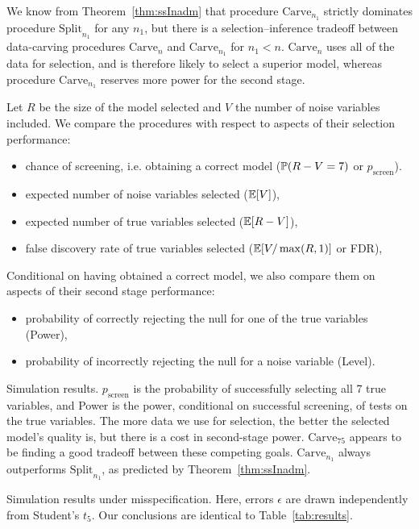 \documentclass{article}
\theoremstyle{definition}
\begin{document}
We know from Theorem~\ref{thm:ssInadm} that procedure $\text{Carve}_{n_1}$ strictly dominates procedure $\text{Split}_{n_1}$ for any $n_1$, but there is a selection--inference tradeoff between data-carving procedures $\text{Carve}_n$ and $\text{Carve}_{n_1}$ for $n_1<n$. $\text{Carve}_{n}$ uses all of the data for selection, and is therefore likely to select a superior model, whereas procedure $\text{Carve}_{n_1}$ reserves more power for the second stage.

Let $R$ be the size of the model selected and $V$ the number of noise variables included. We compare the procedures with respect to aspects of their selection performance:
\begin{itemize}
  \item chance of screening, i.e. obtaining a correct model ($\P(R-V=7)$ or $p_{\text{screen}}$).
  \item expected number of noise variables selected ($\E[V]$),
  \item expected number of true variables selected ($\E[R-V]$),
  \item false discovery rate of true variables selected
    ($\E[V/\max(R, 1)]$ or FDR),
\end{itemize}

Conditional on having obtained a correct model, we also compare them on aspects of their second stage performance:
\begin{itemize}
\item probability of correctly rejecting the null for one of the true variables (Power),
\item probability of incorrectly rejecting the null for a
  noise variable (Level).
\end{itemize}

\begin{table}
  \centering
  
\caption{Simulation results. $p_{\text{screen}}$ is the probability of successfully selecting all 7 true variables, and Power is the power, conditional on successful screening, of tests on the true variables. The more data we use for selection, the better the selected model's quality is, but there is a cost in second-stage power. $\text{Carve}_{75}$ appears to be finding a good tradeoff between these competing goals. $\text{Carve}_{n_1}$ always outperforms $\text{Split}_{n_1}$, as predicted by Theorem~\ref{thm:ssInadm}.}
\label{tab:results}
\end{table}


\begin{table}
\centering

  \caption{Simulation results under misspecification. Here, errors $\epsilon$ are drawn independently from Student's $t_5$. Our conclusions are identical to Table~\ref{tab:results}.}
\label{table:T5}
\end{table}
\end{document}
